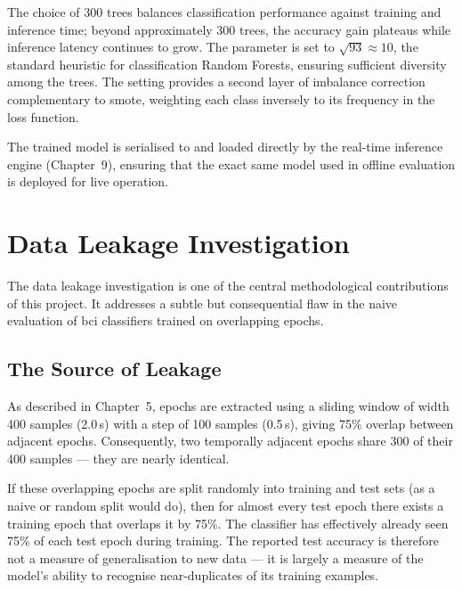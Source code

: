 The choice of 300 trees balances classification performance against
training and inference time; beyond approximately 300 trees, the
accuracy gain plateaus while inference latency continues to grow.
The  parameter is set to $\sqrt{93} \approx 10$,
the standard heuristic for classification Random Forests, ensuring
sufficient diversity among the trees. The  setting provides a second layer of imbalance correction
complementary to \acrshort{smote}, weighting each class inversely
to its frequency in the loss function.

The trained model is serialised to 
and loaded directly by the real-time inference engine
(Chapter~9), ensuring that the exact same model used in offline
evaluation is deployed for live operation.

\section{Data Leakage Investigation}
\label{sec:cl_leakage}

The data leakage investigation is one of the central methodological
contributions of this project. It addresses a subtle but
consequential flaw in the naive evaluation of \acrshort{bci}
classifiers trained on overlapping epochs.

\subsection{The Source of Leakage}

As described in Chapter~5, epochs are extracted using a sliding
window of width 400 samples (2.0\,s) with a step of 100 samples
(0.5\,s), giving 75\% overlap between adjacent epochs. Consequently,
two temporally adjacent epochs share 300 of their 400 samples ---
they are nearly identical.

If these overlapping epochs are split randomly into training and
test sets (as a naive  or random split would
do), then for almost every test epoch there exists a training epoch
that overlaps it by 75\%. The classifier has effectively already
seen 75\% of each test epoch during training. The reported test
accuracy is therefore not a measure of generalisation to new data
— it is largely a measure of the model's ability to recognise
near-duplicates of its training examples.

